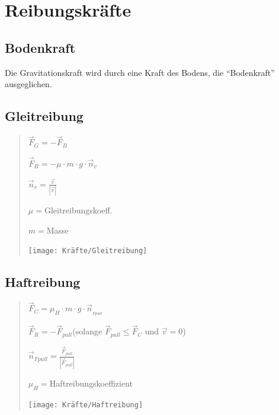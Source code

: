 \section*{Reibungskräfte}


\subsection*{Bodenkraft}

Die Gravitationskraft wird durch eine Kraft des Bodens, die ``Bodenkraft''
ausgeglichen.


\subsection*{Gleitreibung}
\begin{verse}
$\vec{F}_{G}=-\vec{F}_{B}$

$\vec{F}_{R}=-\mu\cdot m\cdot g\cdot\vec{n}_{v}$

$\vec{n}_{v}=\frac{\vec{v}}{|\vec{v}|}$

$\mu=$Gleitreibungskoeff.

$m=$Masse

\texttt{[image: Kräfte/Gleitreibung]}
\end{verse}

\subsection*{Haftreibung}
\begin{verse}
$\vec{F}_{C}=\mu_{H}\cdot m\cdot g\cdot\vec{n}_{_{Fpull}}$

$\vec{F}_{R}=-\vec{F}_{pull}$(solange $\vec{F}_{pull}\leq\vec{F}_{C}$
und $\vec{v}=0$)

$\vec{n}_{Fpull}=\frac{\vec{F}_{pull}}{|\vec{F}_{pull}|}$

$\mu_{H}=$Haftreibungskoeffizient

\texttt{[image: Kräfte/Haftreibung]}\end{verse}

